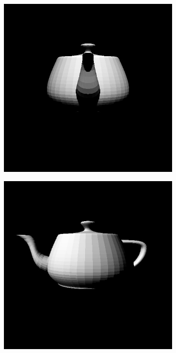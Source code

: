 \documentclass{juliacon}
\begin{document}
\begin{figure}[!htb]
    \centering
    \begin{subfigure}[b]{0.3\textwidth}
        \centering
        \includegraphics[width=\textwidth]{images/render/teapot_front.jpg}
        \caption*{}
    \end{subfigure}
    \hfill
    \begin{subfigure}[b]{0.3\textwidth}
        \centering
        \includegraphics[width=\textwidth]{images/render/teapot_side.jpg}

\end{subfigure}
\end{figure}
\end{document}
